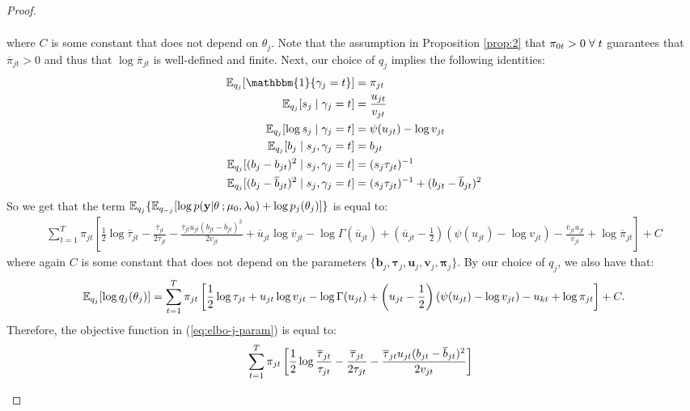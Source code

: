 \begin{proof}
\begin{enumerate}[label=\roman*.]
\begin{align*}
\end{align*}
\normalsize
where $C$ is some constant that does not depend on $\theta_j$. Note that the assumption in Proposition \ref{prop:2} that $\pi_{0t} > 0 \;\forall\; t$ guarantees that $\overline{\pi}_{jt} > 0$ and thus that $\log \overline{\pi}_{jt}$ is well-defined and finite. Next, our choice of $q_j$ implies the following identities:
\begin{align*}
    \E_{q_j}[\mathbbm{1}\{\gamma_j = t\}] &= \pi_{jt} \\
    \E_{q_j}[s_j\;|\;\gamma_j=t] &= \frac{u_{jt}}{v_{jt}} \\
    \E_{q_j}[\log s_j\;|\;\gamma_j=t] &= \psi(u_{jt}) - \log v_{jt} \\
    \E_{q_j}[b_j\;|\;s_j,\gamma_j=t] &= b_{jt} \\
    \E_{q_j}[(b_j - b_{jt})^2 \;|\;s_j,\gamma_j=t] &= (s_j \tau_{jt})^{-1} \\
    \E_{q_j}[(b_j - \overline{b}_{jt})^2 \;|\;s_j,\gamma_j=t] &= (s_j \tau_{jt})^{-1} + (b_{jt} - \overline{b}_{jt})^2
\end{align*}
So we get that the term $\mathbb{E}_{q_j}\{\mathbb{E}_{q_{-j}}[\log p(\mathbf{y}| \theta\:; \mu_0,\lambda_0)+\log p_j(\theta_j)]\}$ is equal to:
\scriptsize
\begin{align*}
    \sum_{t=1}^T \pi_{jt}\left[\frac{1}{2}\log \overline{\tau}_{j t} - \frac{\overline{\tau}_{j t}}{2\tau_{j t}}- \frac{\overline{\tau}_{j t}u_{jt}(b_{j t}  - \overline{b}_{j t})^2}{2v_{jt}} + \overline{u}_{jt} \log \overline{v}_{jt} -  \log\Gamma(\overline{u}_{jt}) + \left(\overline{u}_{jt} -\frac{1}{2}\right)(\psi(u_{jt}) - \log v_{jt}) - \frac{\overline{v}_{jt} u_{jt}}{v_{jt}} + \log \overline{\pi}_{jt}\right] + C
\end{align*}
\normalsize
where again $C$ is some constant that does not depend on the parameters $\{\mathbf{b}_j, \pmb{\tau}_j, \mathbf{u}_j, \mathbf{v}_j, \pmb{\pi}_j\}$. By our choice of $q_j$, we also have that:
\small
\begin{align*}
    \mathbb{E}_{q_j}[\log q_j(\theta_j)] = \sum_{t=1}^T \pi_{jt}\left[ \frac{1}{2}\log \tau_{jt} + u_{jt} \log v_{jt} -  \log\Gamma(u_{jt}) + \left(u_{jt} -\frac{1}{2}\right)(\psi(u_{jt}) - \log v_{jt}) - u_{kt} + \log \pi_{jt}\right] + C.
\end{align*}
\normalsize
Therefore, the objective function in (\ref{eq:elbo-j-param}) is equal to:
\small
\begin{align}
    &\quad\sum_{t=1}^T \pi_{jt}\left[\frac{1}{2}\log \frac{\overline{\tau}_{j t}}{\tau_{jt}} - \frac{\overline{\tau}_{j t}}{2\tau_{j t}}- \frac{\overline{\tau}_{j t}u_{jt}(b_{j t}  - \overline{b}_{j t})^2}{2v_{jt}}\right] \notag\\

\end{align}
\end{enumerate}
\end{proof}

